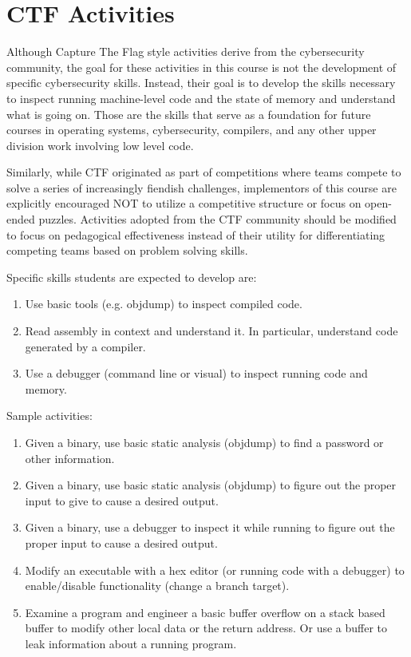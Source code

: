 \documentclass[12pt,letterpaper]{article}
\begin{document}
	
	\section{CTF Activities}

	Although Capture The Flag style activities derive from the cybersecurity community, the goal for these activities in this course is not the development of specific cybersecurity skills. Instead, their goal is to develop the skills necessary to inspect running machine-level code and the state of memory and understand what is going on. Those are the skills that serve as a foundation for future courses in operating systems, cybersecurity, compilers, and any other upper division work involving low level code.

	Similarly, while CTF originated as part of competitions where teams compete to solve a series of increasingly fiendish challenges, implementors of this course are explicitly encouraged NOT to utilize a competitive structure or focus on open-ended puzzles. Activities adopted from the CTF community should be modified to focus on pedagogical effectiveness instead of their utility for differentiating competing teams based on problem solving skills.

	Specific skills students are expected to develop are:

	\begin{enumerate}
		\item Use basic tools (e.g. objdump) to inspect compiled code.
		\item Read assembly in context and understand it. In particular, understand code generated by a compiler.
		\item Use a debugger (command line or visual) to inspect running code and memory.
	\end{enumerate}

	Sample activities:

	\begin{enumerate}
		\item Given a binary, use basic static analysis (objdump) to find a password or other information.
		\item Given a binary, use basic static analysis (objdump) to figure out the proper input to give to cause a desired output. 
		\item Given a binary, use a debugger to inspect it while running to figure out the proper input to cause a desired output. 
		\item Modify an executable with a hex editor (or running code with a debugger) to enable/disable functionality (change a branch target).
		\item Examine a program and engineer a basic buffer overflow on a stack based buffer to modify other local data or the return address. Or use a buffer to leak information about a running program. 
	\end{enumerate}
\end{document}
